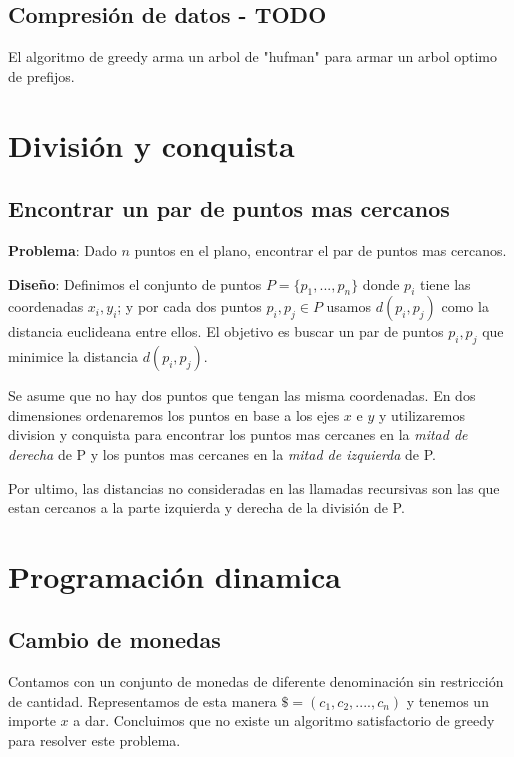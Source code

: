 \documentclass{article}
\begin{document}
\subsection{Compresión de datos - TODO}

El algoritmo de greedy arma un arbol de "hufman" para armar un arbol optimo de prefijos.

\section{División y conquista}

\subsection{Encontrar un par de puntos mas cercanos}

\textbf{Problema}: Dado \(n\) puntos en el plano, encontrar el par de puntos mas cercanos.

\textbf{Diseño}: Definimos el conjunto de puntos \(P=\{p_1,..., p_n\}\) donde \(p_i\) tiene las
coordenadas \(x_i, y_i\); y por cada dos puntos \(p_i, p_j \in P\) usamos \(d(p_i,p_j)\) como 
la distancia euclideana entre ellos. El objetivo es buscar un par de puntos \(p_i, p_j\) que minimice
la distancia \(d(p_i,p_j)\).

Se asume que no hay dos puntos que tengan las misma coordenadas. En dos dimensiones
ordenaremos los puntos en base a los ejes \(x\) e \(y\) y utilizaremos division y conquista
para encontrar los puntos mas cercanes en la \textit{mitad de derecha} de P y los 
puntos mas cercanes en la \textit{mitad de izquierda} de P.

Por ultimo, las distancias no consideradas en las llamadas recursivas son las que estan 
cercanos a la parte izquierda y derecha de la división de P.




\newpage
\section{Programación dinamica}

\subsection{Cambio de monedas}

Contamos con un conjunto de monedas de diferente denominación sin restricción de cantidad. 
Representamos de esta manera \(\$=(c_1,c_2,....,c_n)\) y tenemos un importe \(x\) a dar. 
Concluimos que no existe un algoritmo satisfactorio de greedy para resolver este problema.
\end{document}
